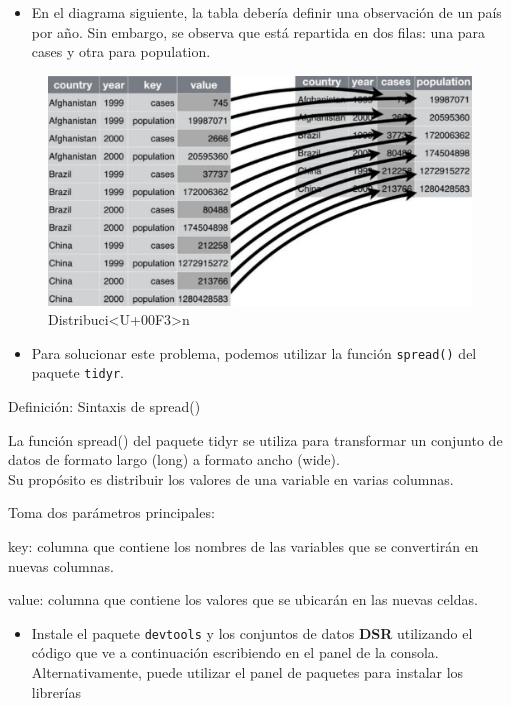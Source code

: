 \documentclass[
]{book}
\providecommand{\tightlist}{%
  \setlength{\itemsep}{0pt}\setlength{\parskip}{0pt}}
\begin{document}
\begin{itemize}
\tightlist
\item
  En el diagrama siguiente, la tabla debería definir una observación de un país por año. Sin embargo, se observa que está repartida en dos filas: una para cases y otra para population.
\end{itemize}

\begin{figure}

{\centering \includegraphics[width=1\linewidth]{images/figura5} 

}

\caption{Distribuci<U+00F3>n}\label{fig:figura5}
\end{figure}

\begin{itemize}
\tightlist
\item
  Para solucionar este problema, podemos utilizar la función \texttt{spread()} del paquete \texttt{tidyr}.
\end{itemize}

{} Definición: Sintaxis de spread()

La función spread() del paquete tidyr se utiliza para transformar un conjunto de datos
de formato largo (long) a formato ancho (wide).\\
Su propósito es distribuir los valores de una variable en varias columnas.

Toma dos parámetros principales:

key: columna que contiene los nombres de las variables que se convertirán en nuevas columnas.

value: columna que contiene los valores que se ubicarán en las nuevas celdas.

\begin{itemize}
\tightlist
\item
  Instale el paquete \texttt{devtools} y los conjuntos de datos \textbf{DSR} utilizando el código que ve a continuación escribiendo en el panel de la consola. Alternativamente, puede utilizar el panel de paquetes para instalar los librerías
\end{itemize}
\end{document}
